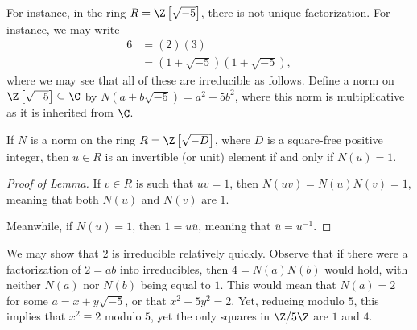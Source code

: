 \documentclass[10pt]{mypackage}
\begin{document}
\begin{example}
For instance, in the ring $R = \Z\left[ \sqrt{-5} \right]$, there is not unique factorization. For instance, we may write
\begin{align*}
  6 &= \left( 2 \right)\left( 3 \right)\\
    &= \left( 1 + \sqrt{-5} \right)\left( 1 + \sqrt{-5} \right),
\end{align*}
where we may see that all of these are irreducible as follows. Define a norm on $\Z\left[ \sqrt{-5} \right]\subseteq \C$ by $N\left( a + b\sqrt{-5} \right) = a^2 + 5b^2$, where this norm is multiplicative as it is inherited from $\C$.
\begin{lemma}
  If $N$ is a norm on the ring $R = \Z\left[ \sqrt{-D} \right]$, where $D$ is a square-free positive integer, then $u\in R$ is an invertible (or unit) element if and only if $N(u) = 1$.
\end{lemma}
\begin{proof}[Proof of Lemma]
  If $v\in R$ is such that $uv = 1$, then $N(uv) = N(u)N(v) = 1$, meaning that both $N(u)$ and $N(v)$ are $1$.\newline

  Meanwhile, if $N(u) = 1$, then $1 = u \overline{u}$, meaning that $ \overline{u} = u^{-1} $.
\end{proof}
We may show that $2$ is irreducible relatively quickly. Observe that if there were a factorization of $2 = ab$ into irreducibles, then $4 = N(a)N(b)$ would hold, with neither $N(a)$ nor $N(b)$ being equal to $1$. This would mean that $N(a) = 2$ for some $a = x + y\sqrt{-5}$, or that $x^2 + 5y^2 = 2$. Yet, reducing modulo $5$, this implies that $x^2 \equiv 2$ modulo $5$, yet the only squares in $\Z/5\Z$ are $1$ and $4$.
\end{example}
\end{document}
